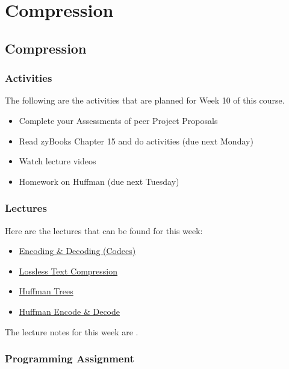 \clearpage

\renewcommand{\ChapTitle}{Compression}

\chapter{\ChapTitle}
\section{\ChapTitle}

\subsection{Activities}

The following are the activities that are planned for Week 10 of this course.

\begin{itemize}
    \item Complete your Assessments of peer Project Proposals
    \item Read zyBooks Chapter 15 and do activities (due next Monday)
    \item Watch lecture videos
    \item Homework on Huffman (due next Tuesday)
\end{itemize}

\subsection{Lectures}

Here are the lectures that can be found for this week:

\begin{itemize}
    \item \href{https://applied.cs.colorado.edu/mod/hvp/view.php?id=46028}{Encoding \& Decoding (Codecs)}
    \item \href{https://applied.cs.colorado.edu/mod/hvp/view.php?id=46029}{Lossless Text Compression}
    \item \href{https://applied.cs.colorado.edu/mod/hvp/view.php?id=46030}{Huffman Trees}
    \item \href{https://applied.cs.colorado.edu/mod/hvp/view.php?id=46031}{Huffman Encode \& Decode}
\end{itemize}
The lecture notes for this week are .

\subsection{Programming Assignment}

